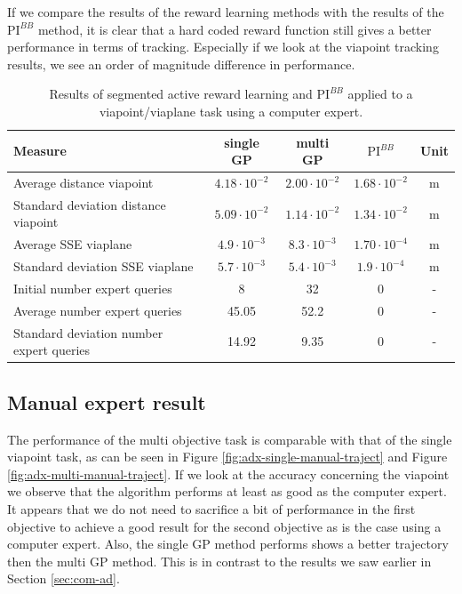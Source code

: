 \documentclass[mscThesis.tex]{subfiles}
\begin{document}
If we compare the results of the reward learning methods with the results of the $\text{PI}^{BB}$ method, it is clear that a hard coded reward function still gives a better performance in terms of tracking. Especially if we look at the viapoint tracking results, we see an order of magnitude difference in performance.

\begin{table}[!htb]
    \centering
    \caption{Results of segmented active reward learning and $\text{PI}^{BB}$ applied to a viapoint/viaplane task using a computer expert.}
    \label{tab:ad-com}
    \begin{tabular}{|p{6cm}|c|c|c|c|}
        \hline
        Measure & single GP & multi GP &  $\text{PI}^{BB}$ & Unit \\ \hline \hline
        Average distance viapoint & $4.18 \cdot 10^{-2}$ & $2.00 \cdot 10^{-2}$ & $1.68 \cdot 10^{-2}$ & \si{m}  \\ \hline
        Standard deviation distance viapoint & $5.09 \cdot 10^{-2}$ & $1.14 \cdot 10^{-2}$ & $1.34 \cdot 10^{-2}$ & \si{m} \\ \hline
        Average SSE viaplane & $4.9 \cdot 10^{-3}$ & $8.3 \cdot 10^{-3}$ & $1.70 \cdot 10^{-4}$ & \si{m}  \\ \hline
        Standard deviation SSE viaplane & $5.7 \cdot 10^{-3}$ & $5.4 \cdot 10^{-3}$ & $1.9 \cdot 10^{-4}$ & \si{m} \\ \hline
        Initial number expert queries & 8 & 32 & 0 & - \\ \hline
        Average number expert queries & 45.05 & 52.2 & 0 & - \\ \hline
        Standard deviation number expert queries & 14.92 & 9.35 & 0 &  - \\ \hline
    \end{tabular}
\end{table}


\subsection{Manual expert result}
The performance of the multi objective task is comparable with that of the single viapoint task, as can be seen in Figure \ref{fig:adx-single-manual-traject} and Figure \ref{fig:adx-multi-manual-traject}. If we look at the accuracy concerning the viapoint we observe that the algorithm performs at least as good as the computer expert. It appears that we do not need to sacrifice a bit of performance in the first objective to achieve a good result for the second objective as is the case using a computer expert. Also, the single GP method performs shows a better trajectory then the multi GP method. This is in contrast to the results we saw earlier in Section \ref{sec:com-ad}. 
\end{document}
